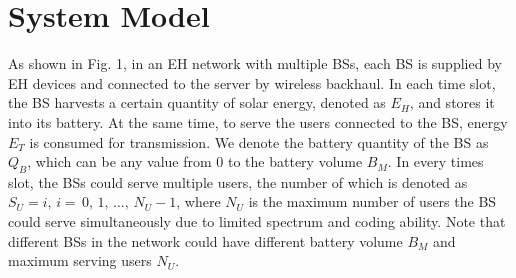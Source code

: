 \documentclass[conference]{IEEEtran}
\begin{document}
\section{System Model}
As shown in Fig. 1, in an EH network with multiple BSs, each BS is supplied by EH devices and connected to the server by wireless backhaul.
In each time slot, the BS harvests a certain quantity of solar energy,
denoted as \(E_H\), and stores it into its battery.
At the same time, to serve the users connected to the BS, energy \(E_T\) is consumed for transmission.
We denote the battery quantity of the BS as \(Q_B\),
which can be any value from \(0\) to the battery volume \(B_M\). In every times slot, the BSs could serve multiple users,
the number of which is denoted as \(S_U = i,\, i = \,0,\,1,\,\ldots,\,N_U-1\), where \(N_U\) is the maximum number of users the BS could serve simultaneously due to limited spectrum and coding ability. Note that different BSs in the network could have different battery volume \(B_M\) and maximum serving users \(N_U\).
\end{document}
